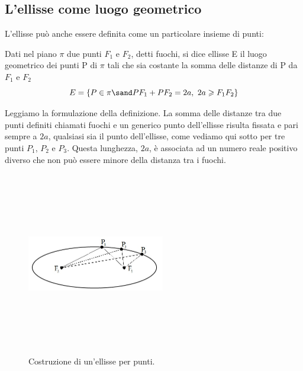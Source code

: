 \subsection{L'ellisse come luogo geometrico}

L'ellisse può anche essere definita come un particolare insieme di punti:

\begin{definizione}
Dati nel piano $\pi$ due punti $F_{1}$ e $F_{2}$, detti fuochi, si 
dice ellisse E il luogo geometrico dei punti P di $\pi$ tali che sia 
costante la somma delle distanze di P da $F_{1}$ e $F_{2}$ 
\begin{equation}
 E=\{P \in\pi \sand PF_{1}+PF_{2} = 2a,~2a \geqslant F_{1}F_{2}\}
\end{equation}
\end{definizione}

Leggiamo la formulazione della definizione. La somma delle distanze tra due 
punti definiti chiamati fuochi e un generico punto dell'ellisse risulta 
fissata e pari sempre a \(2a\), qualsiasi sia il punto dell'ellisse, come 
vediamo qui sotto per tre punti $P_{1}$, $P_{2}$ e $P_{3}$. Questa 
lunghezza, \(2a\), è associata ad un numero reale positivo diverso che non può 
essere minore della distanza tra i fuochi.

\begin{figure}[h]
  \centering
  \includegraphics[height=8cm, width=6cm, keepaspectratio]
{img/ellissepunti.jpg}
  \caption{Costruzione di un'ellisse per punti.}%
\end{figure}

